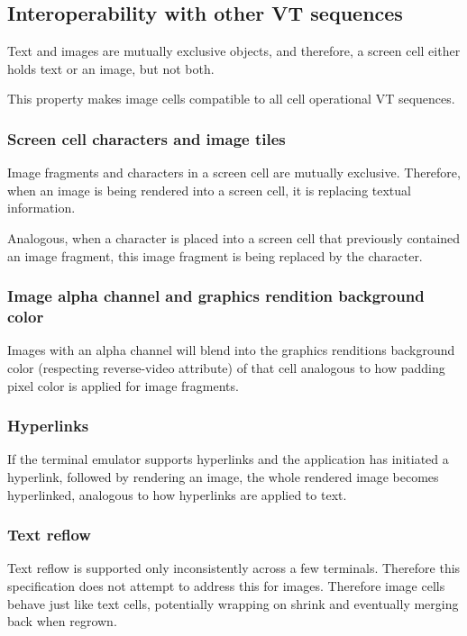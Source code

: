 \documentclass[a4paper]{article}
\begin{document}
\subsection{Interoperability with other VT sequences} %

Text and images are mutually exclusive objects, and therefore,
a screen cell either holds text or an image, but not both.

This property makes image cells compatible to all cell operational VT sequences.

\subsubsection*{Screen cell characters and image tiles}

Image fragments and characters in a screen cell are mutually exclusive.
Therefore, when an image is being rendered into a screen cell,
it is replacing textual information.

Analogous, when a character is placed into a screen cell that previously
contained an image fragment, this image fragment is being replaced by the
character.

\subsubsection*{Image alpha channel and graphics rendition background color}

Images with an alpha channel will blend into the graphics renditions
background color (respecting reverse-video attribute) of that cell analogous
to how padding pixel color is applied for image fragments.

\subsubsection*{Hyperlinks}

If the terminal emulator supports hyperlinks and the application has initiated
a hyperlink, followed by rendering an image, the whole rendered image becomes
hyperlinked, analogous to how hyperlinks are applied to text.

\subsubsection*{Text reflow}

Text reflow is supported only inconsistently across a few terminals. Therefore this
specification does not attempt to address this for images.
Therefore image cells behave just like text cells,
potentially wrapping on shrink and eventually merging back when regrown.
\end{document}
